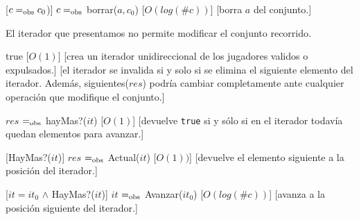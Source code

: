 \begin{Interfaz}
	[$c =_{\mathrm{obs}} c_0$)]
	{$c =_{\mathrm{obs}}$ borrar($a, c_0$)}
	[$O(log(\#c))$]
	[borra $a$ del conjunto.]



	El iterador que presentamos no permite modificar el conjunto recorrido.


	{true}
	[$O(1)$]
	[crea un iterador unidireccional de los jugadores validos o expulsados.]
	[el iterador se invalida si y solo si se elimina el siguiente elemento del iterador. Además, siguientes($res$) podría cambiar completamente ante cualquier operación que modifique el conjunto.]

	{$res$ $=_{\mathrm{obs}}$ hayMas?($it$)}
	[$O(1)$]
	[devuelve \texttt{true} si y sólo si en el iterador todavía quedan elementos para avanzar.]

	[HayMas?($it$)]
	{$res$ $=_{\mathrm{obs}}$ Actual($it$)}
	[$O(1))$]
	[devuelve el elemento siguiente a la posición del iterador.]

	[$it = it_0$ $\land$ HayMas?($it$)]
	{$it$ $=_{\mathrm{obs}}$ Avanzar($it_0$)}
	[$O(log(\#c))$]
	[avanza a la posición siguiente del iterador.]

\end{Interfaz}


